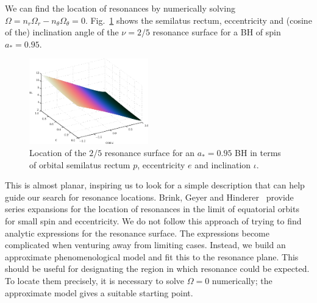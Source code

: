\documentclass[aps,prd,amsfonts,amssymb,amsmath,nofootinbib,showpacs,superscriptaddress,twocolumn]{revtex4}
\newcommand{\Figref}[1]{Fig.\ \ref{fig:#1}}
\begin{document}
We can find the location of resonances by numerically solving $\Omega = n_r \Omega_r - n_\theta \Omega_\theta = 0$. \Figref{res-plane-2-5-95} shows the semilatus rectum, eccentricity and (cosine of the) inclination angle of the $\nu = 2/5$ resonance surface for a BH of spin $a_\ast = 0.95$. 
\begin{figure}[htbp]
\centering
\includegraphics[width=0.46\textwidth]{Fig_res-2-5-95-plane}
\caption{\label{fig:res-plane-2-5-95}Location of the $2/5$ resonance surface for an $a_\ast = 0.95$ BH in terms of orbital semilatus rectum $p$, eccentricity $e$ and inclination $\iota$.}
\end{figure}
This is almost planar, inspiring us to look for a simple description that can help guide our search for resonance locations. Brink, Geyer and Hinderer~\cite{Brink2013} provide series expansions for the location of resonances in the limit of equatorial orbits for small spin and eccentricity. We do not follow this approach of trying to find analytic expressions for the resonance surface. The expressions become complicated when venturing away from limiting cases. Instead, we build an approximate phenomenological model and fit this to the resonance plane. %
This should be useful for designating the region in which resonance could be expected. To locate them precisely, it is necessary to solve $\Omega = 0$ numerically; the approximate model gives a suitable starting point.
\end{document}
